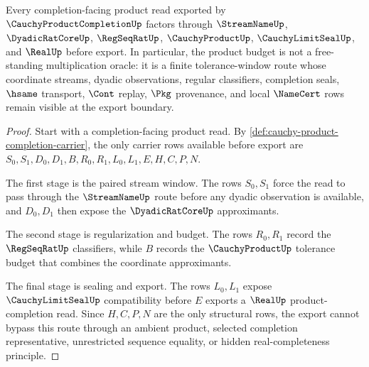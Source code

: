 \begin{theorem}
\label{thm:cauchy-product-completion-budget-factorization}
Every completion-facing product read exported by $\CauchyProductCompletionUp$ factors through $\StreamNameUp$, $\DyadicRatCoreUp$, $\RegSeqRatUp$, $\CauchyProductUp$, $\CauchyLimitSealUp$, and $\RealUp$ before export. In particular, the product budget is not a free-standing multiplication oracle: it is a finite tolerance-window route whose coordinate streams, dyadic observations, regular classifiers, completion seals, $\hsame$ transport, $\Cont$ replay, $\Pkg$ provenance, and local $\NameCert$ rows remain visible at the export boundary.
\end{theorem}
\begin{proof}
Start with a completion-facing product read. By \autoref{def:cauchy-product-completion-carrier}, the only carrier rows available before export are $S_0,S_1,D_0,D_1,B,R_0,R_1,L_0,L_1,E,H,C,P,N$.

The first stage is the paired stream window. The rows $S_0,S_1$ force the read to pass through the $\StreamNameUp$ route before any dyadic observation is available, and $D_0,D_1$ then expose the $\DyadicRatCoreUp$ approximants.

The second stage is regularization and budget. The rows $R_0,R_1$ record the $\RegSeqRatUp$ classifiers, while $B$ records the $\CauchyProductUp$ tolerance budget that combines the coordinate approximants.

The final stage is sealing and export. The rows $L_0,L_1$ expose $\CauchyLimitSealUp$ compatibility before $E$ exports a $\RealUp$ product-completion read. Since $H,C,P,N$ are the only structural rows, the export cannot bypass this route through an ambient product, selected completion representative, unrestricted sequence equality, or hidden real-completeness principle.
\end{proof}

\begin{closurestatus}{\CauchyProductCompletionUp}
  \theoryclosure{\seedClosure}
  \formalstatus{\unformalizedV}
\end{closurestatus}
